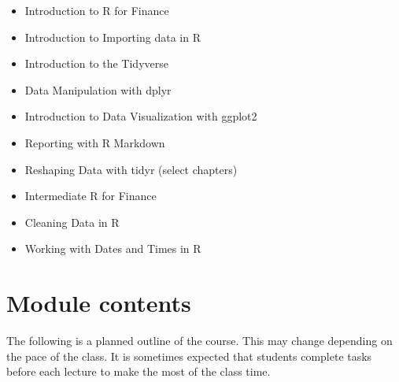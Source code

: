 \documentclass[
  letterpaper,
  DIV=11,
  numbers=noendperiod]{scrartcl}
\providecommand{\tightlist}{%
  \setlength{\itemsep}{0pt}\setlength{\parskip}{0pt}}\usepackage{longtable,booktabs,array}
\begin{document}
\begin{itemize}
\tightlist
\item
  Introduction to R for Finance
\item
  Introduction to Importing data in R
\item
  Introduction to the Tidyverse
\item
  Data Manipulation with dplyr
\item
  Introduction to Data Visualization with ggplot2
\item
  Reporting with R Markdown
\item
  Reshaping Data with tidyr (select chapters)
\item
  Intermediate R for Finance
\item
  Cleaning Data in R
\item
  Working with Dates and Times in R
\end{itemize}

\section{Module contents}\label{sec-contents}

The following is a planned outline of the course. This may change
depending on the pace of the class. It is sometimes expected that
students complete tasks before each lecture to make the most of the
class time.
\end{document}
